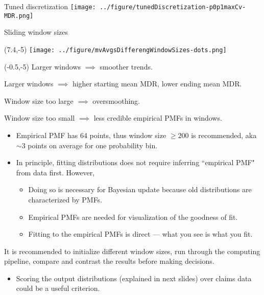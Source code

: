 \documentclass[aspectratio=169]{beamer}
\begin{document}
\begin{frame}{Tuned discretization}
\centering
\texttt{[image: ../figure/tunedDiscretization-p0p1maxCv-MDR.png]}
\end{frame}



\begin{frame}{Sliding window sizes}
\begin{textblock}{1}(7.4,-5)
\texttt{[image: ../figure/mvAvgsDifferengWindowSizes-dots.png]}
\end{textblock}

\begin{textblock}{7.3}(-0.5,-5)
\tiny Larger windows $\implies$ smoother trends.\medskip

\tiny Larger windows $\implies$ higher starting mean MDR, lower ending mean MDR.\medskip

\tiny Window size too large $\implies$ oversmoothing.\medskip

\tiny Window size too small $\implies$ less credible empirical PMFs in windows.\medskip\pause

\tiny\begin{itemize}
\item Empirical PMF has 64 points, thus window size $\ge200$ is recommended, aka $\sim$3 points on average for one probability bin.\medskip

\item In principle, fitting distributions does not require inferring ``empirical PMF" from data first. However,\medskip\pause


\tiny\begin{itemize}

\tiny\item Doing so is necessary for Bayesian update because old distributions are characterized by PMFs.\medskip

\tiny\item Empirical PMFs are needed for visualization of the goodness of fit.\medskip

\tiny\item Fitting to the empirical PMFs is direct --- what you see is what you fit.\medskip

\end{itemize}
\end{itemize}\pause


It is recommended to initialize different window sizes, run through the computing pipeline, compare and contrast the results before making decisions.\medskip

\begin{itemize}
\item Scoring the output distributions (explained in next slides) over claims data could be a useful criterion.
\end{itemize}


\end{textblock}

\end{frame}
\end{document}
